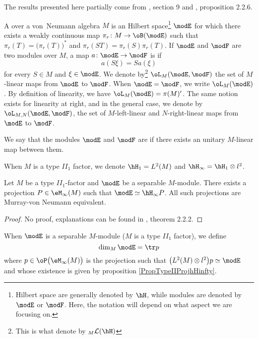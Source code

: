 The results presented here partially come from \cite{Wassermann}, section 9 and \cite{JonesSunder}, proposition 2.2.6.

A  over a von~Neumann algebra $M$ is an Hilbert space\footnote{Hilbert space are generally denoted by $\hH$, while modules are denoted by $\modE$ or $\modF$. Here, the notation will depend on what aspect we are focusing on.} $\modE$ for which there exists a weakly continuous map $\pi_r\colon M\to \oB(\modE)$ such that $\pi_r(T)=\big( \pi_r(T) \big)^*$ and $\pi_r(ST)=\pi_r(S)\pi_r(T)$. If $\modE$ and $\modF$ are two modules over $M$, a map $a\colon \modE\to \modF$ is  if 
\begin{equation}
	a(S\xi)=Sa(\xi)
\end{equation}
for every $S\in M$ and $\xi\in\modE$. We denote by\footnote{This is what \cite{JonesSunder} denote by $_M\mathcal{L}(\hH)$} $\oL_M(\modE,\modF)$ the set of $M$-linear maps from $\modE$ to $\modF$. When $\modE=\modF$, we write $\oL_M(\modE)$. By definition of linearity, we have $\oL_M(\modE)=\pi(M)'$. The same notion exists for linearity at right, and in the general case, we denote by $\oL_{M,N}(\modE,\modF)$, the set of $M$-left-linear and $N$-right-linear maps from $\modE$ to $\modF$.



 We say that the modules $\modE$ and $\modF$ are  if there exists an unitary $M$-linear map between them.

When $M$ is a type $II_1$ factor, we denote $\hH_1=L^2(M)$ and $\hH_{\infty}=\hH_1\otimes l^2$.
\begin{proposition}			\label{PropTypeIIProjhHinfty}
Let $M$ be a type $II_1$-factor and $\modE$ be a separable $M$-module. There exists a projection $P\in \eM_{\infty}(M)$ such that $\modE\simeq \hH_{\infty}P$. All such projections are Murray-von Neumann equivalent.
\end{proposition}
\begin{proof}
No proof, explanations can be found in \cite{JonesSunder}, theorem 2.2.2.
\end{proof}

When $\modE$ is a separable $M$-module ($M$ is a type $II_1$ factor), we define
\begin{equation}
	\dim_M\modE=\tr p
\end{equation}
where $p\in\oP\big( \eM_{\infty}(M) \big)$ is the projection such that $\big( L^2(M)\otimes l^2 \big)p\simeq \modE$ and whose existence is given by proposition \ref{PropTypeIIProjhHinfty}.

